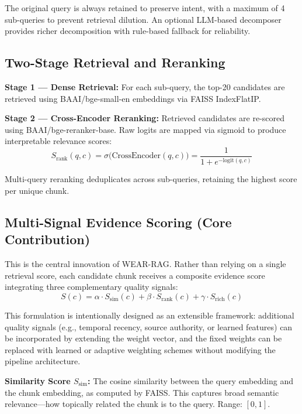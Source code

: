 \documentclass[conference]{IEEEtran}
\begin{document}
The original query is always retained to preserve intent, with a maximum of 4 sub-queries to prevent retrieval dilution. An optional LLM-based decomposer provides richer decomposition with rule-based fallback for reliability.

\subsection{Two-Stage Retrieval and Reranking}

\textbf{Stage 1 --- Dense Retrieval:} For each sub-query, the top-20 candidates are retrieved using BAAI/bge-small-en embeddings via FAISS IndexFlatIP.

\textbf{Stage 2 --- Cross-Encoder Reranking:} Retrieved candidates are re-scored using BAAI/bge-reranker-base. Raw logits are mapped via sigmoid to produce interpretable relevance scores:
\begin{equation}
S_{\text{rank}}(q, c) = \sigma\bigl(\text{CrossEncoder}(q, c)\bigr) = \frac{1}{1 + e^{-\text{logit}(q,c)}}
\end{equation}

Multi-query reranking deduplicates across sub-queries, retaining the highest score per unique chunk.

\subsection{Multi-Signal Evidence Scoring (Core Contribution)}

This is the central innovation of WEAR-RAG. Rather than relying on a single retrieval score, each candidate chunk receives a composite evidence score integrating three complementary quality signals:
\begin{equation}
S(c) = \alpha \cdot S_{\text{sim}}(c) + \beta \cdot S_{\text{rank}}(c) + \gamma \cdot S_{\text{rich}}(c)
\label{eq:evidence}
\end{equation}

This formulation is intentionally designed as an extensible framework: additional quality signals (e.g., temporal recency, source authority, or learned features) can be incorporated by extending the weight vector, and the fixed weights can be replaced with learned or adaptive weighting schemes without modifying the pipeline architecture.

\textbf{Similarity Score $S_{\text{sim}}$:} The cosine similarity between the query embedding and the chunk embedding, as computed by FAISS. This captures broad semantic relevance---how topically related the chunk is to the query. Range: $[0, 1]$.
\end{document}
